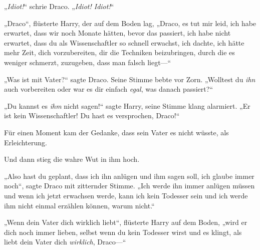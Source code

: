 „\emph{Idiot!}“ schrie Draco. „\emph{Idiot! Idiot!}“

„Draco“, flüsterte Harry, der auf dem Boden lag, „Draco, es tut mir leid, ich habe erwartet, dass wir noch Monate hätten, bevor das passiert, ich habe nicht erwartet, dass du als Wissenschaftler so schnell erwachst, ich dachte, ich hätte mehr Zeit, dich vorzubereiten, dir die Techniken beizubringen, durch die es weniger schmerzt, zuzugeben, dass man falsch liegt—“

„Was ist mit Vater?“ sagte Draco. Seine Stimme bebte vor Zorn. „Wolltest du \emph{ihn} auch vorbereiten oder war es dir einfach \emph{egal}, was danach passiert?“

„Du kannst es \emph{ihm} nicht sagen!“ sagte Harry, seine Stimme klang alarmiert. „Er ist kein Wissenschaftler! Du hast es versprochen, Draco!“

Für einen Moment kam der Gedanke, dass sein Vater es nicht wüsste, als Erleichterung.

Und dann stieg die wahre Wut in ihm hoch.

„Also hast du geplant, dass ich ihn anlügen und ihm sagen soll, ich glaube immer noch“, sagte Draco mit zitternder Stimme. „Ich werde ihn immer anlügen müssen und wenn ich jetzt erwachsen werde, kann ich kein Todesser sein und ich werde ihm nicht einmal erzählen können, warum nicht.“

„Wenn dein Vater dich wirklich liebt“, flüsterte Harry auf dem Boden, „wird er dich noch immer lieben, selbst wenn du kein Todesser wirst und es klingt, als liebt dein Vater dich \emph{wirklich}, Draco—“

